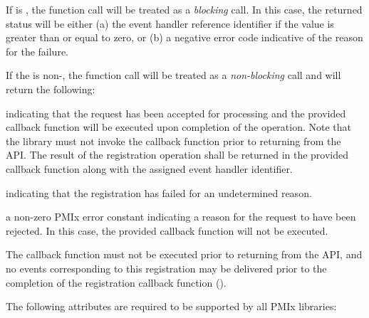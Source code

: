 \begin{arglist}
\end{arglist}


If  is , the function call will be treated as a \emph{blocking} call. In this case, the returned status will be either (a) the event handler reference identifier if the value is greater than or equal to zero, or (b) a negative error code indicative of the reason for the failure.

If the  is non-, the function call will be treated as a \emph{non-blocking} call and will return the following:

\begin{constantdesc}
\item {} indicating that the request has been accepted for processing and the provided callback function will be executed upon completion of the operation. Note that the library must not invoke the callback function prior to returning from the \ac{API}. The result of the registration operation shall be returned in the provided callback function along with the assigned event handler identifier.
\item {} indicating that the registration
has failed for an undetermined reason.
\item a non-zero \ac{PMIx} error constant indicating a reason for the request to have been rejected. In this case, the provided callback function will not be executed.
\end{constantdesc}

The callback function must not be executed prior to returning from the \ac{API}, and no events corresponding to this registration may be delivered prior to the completion of the registration callback function ().

\reqattrstart
The following attributes are required to be supported by all \ac{PMIx} libraries:

